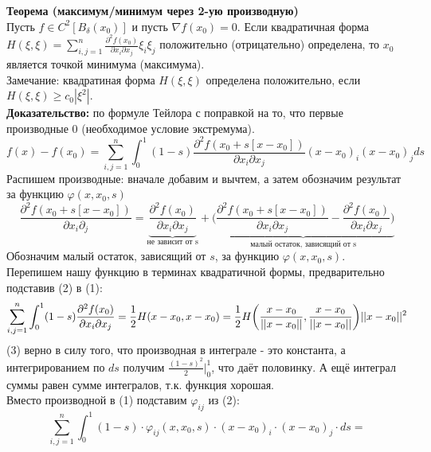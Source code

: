 \documentclass[book, 11pt]{report}
\begin{document}
    \par{
    \textbf{Теорема (максимум/минимум через 2-ую производную)} \\
    Пусть $f\in C^2[B_\delta(x_0)]$ и пусть $\nabla f(x_0)=0$. Если квадратичная форма \\ $\displaystyle H(\xi, \xi)=\sum_{i,j=1}^n\frac{\partial^2f(x_0)}{\partial x_i\partial x_j}\xi_i\xi_j$ положительно (отрицательно) определена, то $x_0$ является точкой минимума (максимума). \\ Замечание: квадратиная форма $H(\xi, \xi)$ определена положительно, если $H(\xi, \xi)\geq c_0|\xi^2|$.\\ \textbf{Доказательство: } по формуле Тейлора с поправкой на то, что первые производные 0 (необходимое условие экстремума).
    \begin{equation}
        f(x)-f(x_0)=\sum_{i,j=1}^n\int_0^1(1-s)\frac{\partial^2 f(x_0+s[x-x_0])}{\partial x_i\partial x_j}(x-x_0)_i(x-x_0)_jds
    \end{equation}
    Распишем производные: вначале добавим и вычтем, а затем обозначим результат за функцию $\varphi(x,x_0,s)$
    \begin{equation}
        \frac{\partial^2 f(x_0+s[x-x_0])}{\partial x_i\partial_j}=\underbrace{\frac{\partial^2f(x_0)}{\partial x_i\partial x_j}}_{\text{не зависит от s}}+\underbrace{\bigg(\frac{\partial^2 f(x_0+s[x-x_0])}{\partial x_i\partial x_j}-\frac{\partial^2f(x_0)}{\partial x_i\partial x_j}\bigg)}_{\text{малый остаток, зависящий от s}}
    \end{equation}
    Обозначим малый остаток, зависящий от $s$, за функцию $\varphi(x,x_0,s)$. \\
    Перепишем нашу функцию в терминах квадратичной формы, предварительно подставив (2) в (1):
    \begin{equation}
        \sum_{i,j=1}^n\int_0^1(1-s)\frac{\partial^2 f(x_0)}{\partial x_i\partial x_j}={1\over 2}H(x-x_0,x-x_0)={1\over2}H\bigg(\frac{x-x_0}{||x-x_0||},\frac{x-x_0}{||x-x_0||}\bigg)||x-x_0||^2
    \end{equation}
    (3) верно в силу того, что производная в интеграле - это константа, а интегрированием по $ds$ получим $\frac{(1-s)^2}{2}|^1_0$, что даёт половинку. А ещё интеграл суммы равен сумме интегралов, т.к. функция хорошая.\\
    Вместо производной в (1) подставим $\varphi_{ij}$ из (2):
    \begin{equation*}
        \sum_{i,j=1}^n\int_0^1(1-s)\cdot\varphi_{ij} (x,x_0,s)\cdot(x-x_0)_i\cdot(x-x_0)_j\cdot ds=

\end{equation*}}
\end{document}
